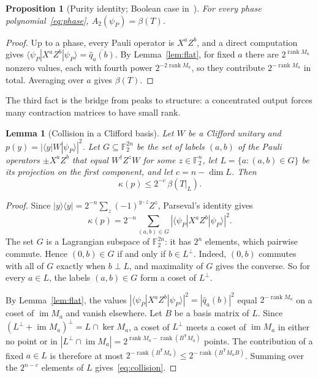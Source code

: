 \documentclass[a4paper,onecolumn,11pt,unpublished]{quantumarticle}
\theoremstyle{plain}
\newtheorem{lemma}[theorem]{Lemma}
\newtheorem{proposition}[theorem]{Proposition}
\theoremstyle{remark}
\newcommand{\F}{\mathbb{F}_2}
\newcommand{\ket}[1]{|#1\rangle}
\newcommand{\bra}[1]{\langle #1|}
\DeclareMathOperator{\rank}{rank}
\DeclareMathOperator{\img}{im}
\newcommand{\T}{\mathsf{T}}
\begin{document}
\begin{proposition}[Purity identity; Boolean case in~\cite{KT26}]\label{prop:purity}
For every phase polynomial~\eqref{eq:phase}, $A_2(\psi_P)=\beta(T)$.
\end{proposition}

\begin{proof}
Up to a phase, every Pauli operator is $X^aZ^b$, and a direct computation gives $\bra{\psi_P}X^aZ^b\ket{\psi_P}=\overline{\hat q_a(b)}$. By Lemma~\ref{lem:flat}, for fixed $a$ there are $2^{\rank M_a}$ nonzero values, each with fourth power $2^{-2\rank M_a}$, so they contribute $2^{-\rank M_a}$ in total. Averaging over $a$ gives $\beta(T)$.
\end{proof}

The third fact is the bridge from peaks to structure: a concentrated output forces many contraction matrices to have small rank.

\begin{lemma}[Collision in a Clifford basis]\label{lem:collision}
Let $W$ be a Clifford unitary and $p(y)=|\bra{y}W\ket{\psi_P}|^2$. Let $G\subseteq\F^{2n}$ be the set of labels $(a,b)$ of the Pauli operators $\pm X^aZ^b$ that equal $W^\dagger Z^zW$ for some $z\in\F^n$, let $L=\{a:(a,b)\in G\}$ be its projection on the first component, and let $c=n-\dim L$. Then
\begin{equation}\label{eq:collision}
\kappa(p)\le 2^{-c}\,\beta(T|_L).
\end{equation}
\end{lemma}

\begin{proof}
Since $\ket{y}\!\bra{y}=2^{-n}\sum_z(-1)^{y\cdot z}Z^z$, Parseval's identity gives
\[
\kappa(p)=2^{-n}\sum_{(a,b)\in G}|\bra{\psi_P}X^aZ^b\ket{\psi_P}|^2.
\]
The set $G$ is a Lagrangian subspace of $\F^{2n}$: it has $2^n$ elements, which pairwise commute. Hence $(0,b)\in G$ if and only if $b\in L^\perp$. Indeed, $(0,b)$ commutes with all of $G$ exactly when $b\perp L$, and maximality of $G$ gives the converse. So for every $a\in L$, the labels $(a,b)\in G$ form a coset of $L^\perp$.

By Lemma~\ref{lem:flat}, the values $|\bra{\psi_P}X^aZ^b\ket{\psi_P}|^2=|\hat q_a(b)|^2$ equal $2^{-\rank M_a}$ on a coset of $\img M_a$ and vanish elsewhere. Let $B$ be a basis matrix of $L$. Since $(L^\perp+\img M_a)^\perp=L\cap\ker M_a$, a coset of $L^\perp$ meets a coset of $\img M_a$ in either no point or in $|L^\perp\cap\img M_a|=2^{\rank M_a-\rank(B^\T M_a)}$ points. The contribution of a fixed $a\in L$ is therefore at most $2^{-\rank(B^\T M_a)}\le2^{-\rank(B^\T M_aB)}$. Summing over the $2^{n-c}$ elements of $L$ gives~\eqref{eq:collision}.
\end{proof}
\end{document}

